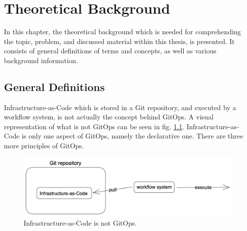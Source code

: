 \chapter{Theoretical Background} 	%
\label{theoretical-background}


In this chapter,
the theoretical background which is needed for comprehending the topic, problem,
and discussed material
within this thesis,
is presented.
It consists of general definitions of terms and concepts,
as well as various background information.


\section{General Definitions}
\label{theoretical-background:general-definitions}



Infrastructure-as-Code which is stored in a Git repository,
and executed by a workflow system,
is not actually the concept behind GitOps.
A visual representation of what is not GitOps can be seen in
fig. \ref{fig:iac-is-not-gitops}.
Infrastructure-as-Code is only one aspect of GitOps, namely the declarative one.
There are three more principles of GitOps.

\begin{figure}[h]
	\centering
	\includegraphics[width=1.00\linewidth]{assets/iac-is-not-gitops.png}
	\caption{Infrastructure-as-Code is not GitOps.
	}
	\label{fig:iac-is-not-gitops}	
\end{figure}


